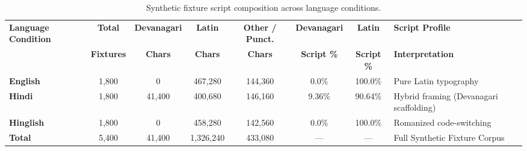 \documentclass[11pt,a4paper]{article}
\begin{document}
\begin{table}[htbp]
\centering
\small
\begin{tabularx}{\textwidth}{l c c c c c c X}
\toprule
\textbf{Language Condition} & \textbf{Total} & \textbf{Devanagari} & \textbf{Latin} & \textbf{Other / Punct.} & \textbf{Devanagari} & \textbf{Latin} & \textbf{Script Profile} \\
& \textbf{Fixtures} & \textbf{Chars} & \textbf{Chars} & \textbf{Chars} & \textbf{Script \%} & \textbf{Script \%} & \textbf{Interpretation} \\
\midrule
\textbf{English} & 1,800 & 0 & 467,280 & 144,360 & 0.0\% & 100.0\% & Pure Latin typography \\
\textbf{Hindi} & 1,800 & 41,400 & 400,680 & 146,160 & 9.36\% & 90.64\% & Hybrid framing (Devanagari scaffolding) \\
\textbf{Hinglish} & 1,800 & 0 & 458,280 & 142,560 & 0.0\% & 100.0\% & Romanized code-switching \\
\midrule
\textbf{Total} & 5,400 & 41,400 & 1,326,240 & 433,080 & --- & --- & Full Synthetic Fixture Corpus \\
\bottomrule
\end{tabularx}
\caption{Synthetic fixture script composition across language conditions.}
\label{tab:script_composition_appendix}
\end{table}
\end{document}
